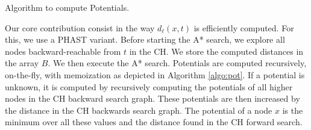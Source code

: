 \documentclass[a4paper,UKenglish,cleveref, autoref]{lipics-v2019}
\begin{document}
\begin{algorithm2e}

\caption{Algorithm to compute Potentials.}
\label{algo:pot}

\end{algorithm2e}

Our core contribution consist in the way $d_{\ell}(x,t)$ is efficiently computed.
For this, we use a PHAST variant.
Before starting the A* search, we explore all nodes backward-reachable from $t$ in the CH.
We store the computed distances in the array $B$.
We then execute the A* search.
Potentials are computed recursively, on-the-fly, with memoization as depicted in Algorithm \ref{algo:pot}.
If a potential is unknown, it is computed by recursively computing the potentials of all higher nodes in the CH backward search graph.
These potentials are then increased by the distance in the CH backwards search graph.
The potential of a node $x$ is the minimum over all these values and the distance found in the CH forward search.




\end{document}
